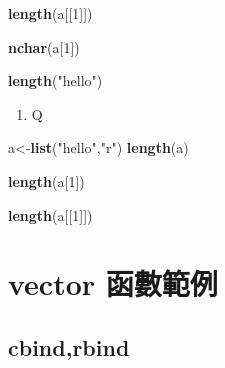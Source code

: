 \documentclass[]{book}
\newenvironment{Shaded}{\begin{snugshade}}{\end{snugshade}}
\newcommand{\DecValTok}[1]{\textcolor[rgb]{0.00,0.00,0.81}{#1}}
\newcommand{\KeywordTok}[1]{\textcolor[rgb]{0.13,0.29,0.53}{\textbf{#1}}}
\newcommand{\NormalTok}[1]{#1}
\newcommand{\StringTok}[1]{\textcolor[rgb]{0.31,0.60,0.02}{#1}}
\providecommand{\tightlist}{%
  \setlength{\itemsep}{0pt}\setlength{\parskip}{0pt}}
\theoremstyle{definition}
\theoremstyle{definition}
\theoremstyle{definition}
\theoremstyle{remark}
\begin{document}
\begin{Shaded}
\begin{Highlighting}[]
\KeywordTok{length}\NormalTok{(a[[}\DecValTok{1}\NormalTok{]])}
\end{Highlighting}
\end{Shaded}

\begin{Shaded}
\begin{Highlighting}[]
\KeywordTok{nchar}\NormalTok{(a[}\DecValTok{1}\NormalTok{])}
\end{Highlighting}
\end{Shaded}

\begin{Shaded}
\begin{Highlighting}[]
\KeywordTok{length}\NormalTok{(}\StringTok{"hello"}\NormalTok{)}
\end{Highlighting}
\end{Shaded}

\begin{enumerate}
\def\labelenumi{\arabic{enumi}.}
\tightlist
\item
  Q
\end{enumerate}

\begin{Shaded}
\begin{Highlighting}[]
\NormalTok{a<-}\KeywordTok{list}\NormalTok{(}\StringTok{"hello"}\NormalTok{,}\StringTok{"r"}\NormalTok{)}
\KeywordTok{length}\NormalTok{(a)}
\end{Highlighting}
\end{Shaded}

\begin{Shaded}
\begin{Highlighting}[]
\KeywordTok{length}\NormalTok{(a[}\DecValTok{1}\NormalTok{])}
\end{Highlighting}
\end{Shaded}

\begin{Shaded}
\begin{Highlighting}[]
\KeywordTok{length}\NormalTok{(a[[}\DecValTok{1}\NormalTok{]])}
\end{Highlighting}
\end{Shaded}

\hypertarget{vector-}{%
\section{vector 函數範例}\label{vector-}}

\hypertarget{cbindrbind}{%
\subsection{cbind,rbind}\label{cbindrbind}}
\end{document}
